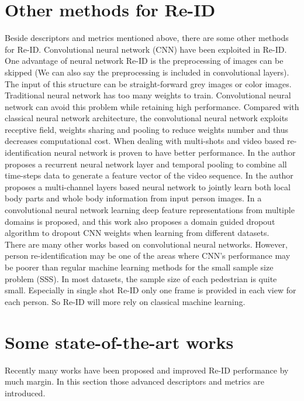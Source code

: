 \section{Other methods for Re-ID}
Beside descriptors and metrics mentioned above, there are some other methods for Re-ID. Convolutional neural network (CNN) have been exploited in Re-ID. One advantage of neural network Re-ID is the preprocessing of images can be skipped (We can also say the preprocessing is included in convolutional layers). The input of this structure can be straight-forward grey images or color images.  Traditional neural network has too many weights to train. Convolutional neural network can avoid this problem while retaining high performance. Compared with classical neural network architecture, the convolutional neural network exploits receptive field, weights sharing and pooling to reduce weights number and thus decreases computational cost. When dealing with multi-shots and video based re-identification neural network is proven to have better performance. In \cite{RecurrentCNN} the author proposes a recurrent neural network layer and temporal pooling to combine all time-steps data to generate a feature vector of the video sequence. In \cite{MultiCNN} the author proposes a multi-channel layers based neural network to jointly learn both local body parts and whole body information from input person images.  In \cite{DeepfeatureCNN} a convolutional neural network learning deep feature representations from multiple domains is proposed, and this work also proposes a domain guided dropout algorithm to dropout CNN weights when learning from different datasets. \\
\indent There are many other works based on convolutional neural networks. However, person re-identification may be one of the areas where CNN's performance may be poorer than regular machine learning methods for the small sample size problem (SSS). In most datasets, the sample size of each pedestrian is quite small. Especially in single shot Re-ID only one frame is provided in each view for each person. So Re-ID will more rely on classical machine learning.

%

\section{Some state-of-the-art works}
Recently many works have been proposed and improved Re-ID performance by much margin. In this section those advanced descriptors and metrics are introduced. 

